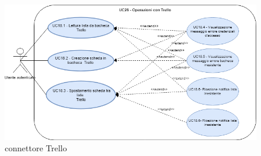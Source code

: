 \begin{figure}[H]
	\centering
	\includegraphics[width=14cm,keepaspectratio]{../includes/pics/trello.png}
	\caption{\label{fig:mission}connettore Trello}
\end{figure}

